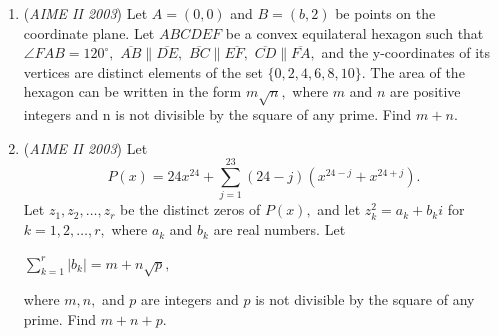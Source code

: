 \begin{enumerate}
	\item (\textit{AIME II 2003}) Let $A = (0,0)$ and $B = (b,2)$ be points on the coordinate plane. Let $ABCDEF$ be a convex equilateral hexagon such that $\angle FAB = 120^\circ,$ $\overline{AB}\parallel \overline{DE},$ $\overline{BC}\parallel \overline{EF,}$ $\overline{CD}\parallel \overline{FA},$ and the y-coordinates of its vertices are distinct elements of the set $\{0,2,4,6,8,10\}.$ The area of the hexagon can be written in the form $m\sqrt {n},$ where $m$ and $n$ are positive integers and n is not divisible by the square of any prime. Find $m + n.$


	\item (\textit{AIME II 2003}) Let 
 \[P(x) = 24x^{24} + \sum_{j = 1}^{23}(24 - j)(x^{24 - j} + x^{24 + j}).\] Let $z_{1},z_{2},\ldots,z_{r}$ be the distinct zeros of $P(x),$ and let $z_{k}^{2} = a_{k} + b_{k}i$ for $k = 1,2,\ldots,r,$ where $a_{k}$ and $b_{k}$ are real numbers. Let


 $\sum_{k = 1}^{r}|b_{k}| = m + n\sqrt {p},$

 where $m, n,$ and $p$ are integers and $p$ is not divisible by the square of any prime. Find $m + n + p.$


\end{enumerate}